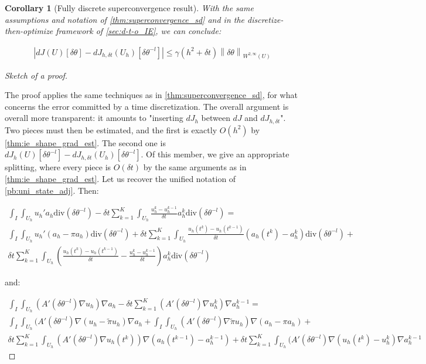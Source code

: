 \documentclass[english,a4paper,9pt,oneside]{scrbook}	%
\theoremstyle{break}
\newtheorem{cor}[equation]{Corollary}
\newenvironment{mproof}[1][\proofname]{%
  \begin{proof}[#1]$ $\par\nobreak\ignorespaces
}{%
  \end{proof}
}
\renewcommand*{\proofname}{Proof}
\theoremstyle{remark}
\newcommand{\ds}{\displaystyle}
\newcommand{\norm}[1]{\left\lVert#1\right\rVert}
\newcommand{\te}{\theta}
\newcommand{\dive}{\text{div}}
\begin{document}
\begin{cor}[Fully discrete superconvergence result]
\label{cor:superconvergence_sd_fd_IE}
With the same assumptions and notation of \cref{thm:superconvergence_sd} and in the discretize-then-optimize framework of \cref{sec:d-t-o_IE}, we can conclude:  

\begin{align*}
	\left |dJ(U)[\delta \te] - dJ_{h,\delta t}(U_h)[\delta \te^{-l}] \right|\leq \gamma  (h^2 + \delta t)\norm{\delta \te}_{W^{2,\infty}(U)}
\end{align*}

\end{cor}
\begin{mproof}[Sketch of a proof]
The proof applies the same techniques as in \cref{thm:superconvergence_sd}, for what concerns the error committed by a time discretization. 
The overall argument is overall more transparent: it amounts to "inserting $dJ_h$ between $dJ$ and $dJ_{h,\delta t}$". Two pieces must then be estimated, and the first is exactly $O(h^2)$ by  \cref{thm:ie_shape_grad_est}.
The second one is $\ds dJ_h(U)[\delta \te^{-l}] - dJ_{h,\delta t}(U_h)[\delta \te^{-l}]$. Of this member, we give an appropriate splitting, where every piece is $O(\delta t)$ by the same arguments as in  \cref{thm:ie_shape_grad_est}. Let us recover the unified notation of \cref{pb:uni_state_adj}. Then:

\begin{align*}
	\int_I\int_{U_h}u_h'a_h\dive(\delta \te^{-l})-\delta t \sum_{k=1}^K \int_{U_h} \frac{u_h^k-u_h^{k-1}}{\delta t}a_h^k \dive(\delta \te^{-l})  =\\
	\int_I\int_{U_h}u_h'(a_h-\pi a_h)\dive(\delta \te^{-l})+
	\delta t \sum_{k=1}^K\int_{U_h}\frac{u_h(t^k)-u_h(t^{k-1})}{\delta t}(a_h(t^k)-a_h^k)\dive(\delta \te^{-l})+\\
	\delta t \sum_{k=1}^K \int_{U_h} \left (\frac{u_h(t^k)-u_h(t^{k-1})}{\delta t}-\frac{u_h^k-u_h^{k-1}}{\delta t}\right )a_h^k \dive(\delta \te^{-l})
\end{align*}

and:

\begin{align*}
	\int_I \int_{U_h} (A'(\delta \te^{-l})\nabla u_h)\nabla a_h - \delta t \sum_{k=1}^K (A'(\delta \te^{-l})\nabla u_h^k)\nabla a_h^{k-1} =  \\
	\int_I \int_{U_h} (A'(\delta \te^{-l})\nabla (u_h-\tilde{\pi} u_h)\nabla a_h + 
	\int_I \int_{U_h} (A'(\delta \te^{-l})\nabla \tilde{\pi} u_h ) \nabla (a_h - \pi a_h) +\\
	\delta t \sum_{k=1}^K \int_{U_h} (A'(\delta \te^{-l})\nabla u_h(t^k) ) \nabla( a_h(t^{k-1})-a_h^{k-1}) +
	\delta t \sum_{k=1}^K \int_{U_h} (A'(\delta \te^{-l})\nabla (u_h(t^k)-u_h^k ) \nabla a_h^{k-1}
\end{align*}


\end{mproof}
\end{document}
